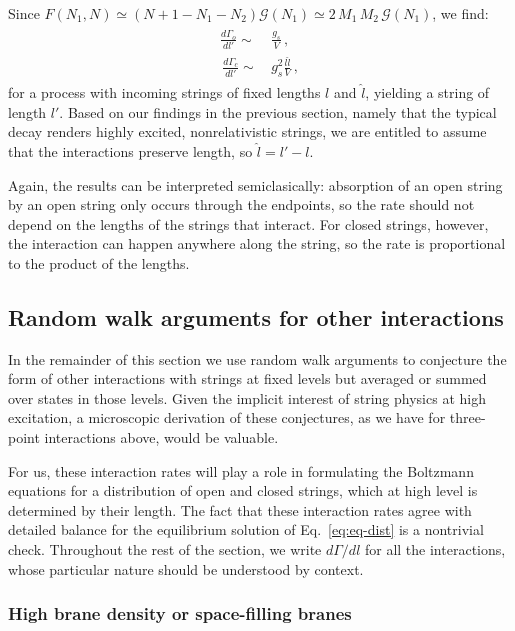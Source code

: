 \documentclass[a4paper,11pt]{article}
\begin{document}
Since $F(N_1,N)\simeq (N+1-N_1-N_2)\mathcal{G}(N_1)\simeq 2\, M_1\, M_2\, \mathcal{G}(N_1)$, we find: 
\begin{gather}\label{eq:absorption-rates}
\begin{split}
    \frac{d \Gamma_o}{dl'} \sim & \, \frac{g_s}{V} \, , \\
    \, \frac{d \Gamma_{c}}{dl'} \sim & \,  g_s^2 \frac{l\hat{l}}{V} \, , 
\end{split}
\end{gather}
for a process with incoming strings of fixed lengths $l$ and $\hat{l}$, yielding a string of length $l'$.
Based on our findings in the previous section, namely that the typical decay renders highly excited, nonrelativistic strings, we are entitled to assume that the interactions preserve length, so $\hat{l}=l'-l$.

Again, the results can be interpreted semiclasically: absorption of an open string by an open string only occurs through the endpoints, so the rate should not depend on the lengths of the strings that interact. 
For closed strings, however, the interaction can happen anywhere along the string, so the rate is proportional to the product of the lengths. 

\subsection{Random walk arguments for other interactions}\label{sec:rws}

In the remainder of this section we use random walk arguments to conjecture the form of other interactions with strings at fixed levels but averaged or summed over states in those levels. Given the implicit interest of string physics at
high excitation, a microscopic derivation of these conjectures, as we have for 
three-point interactions above, would be valuable.

For us, these interaction rates will
play a role in formulating the Boltzmann equations for a distribution of open and closed strings, which at high level is determined by their length.
The fact that these interaction rates agree with detailed balance for the equilibrium solution of Eq.~\eqref{eq:eq-dist} is a nontrivial check.
Throughout the rest of the section, we write $d \Gamma/dl$ for all the interactions, whose particular nature should be understood by context.


\subsubsection*{High brane density or space-filling branes}
\end{document}
